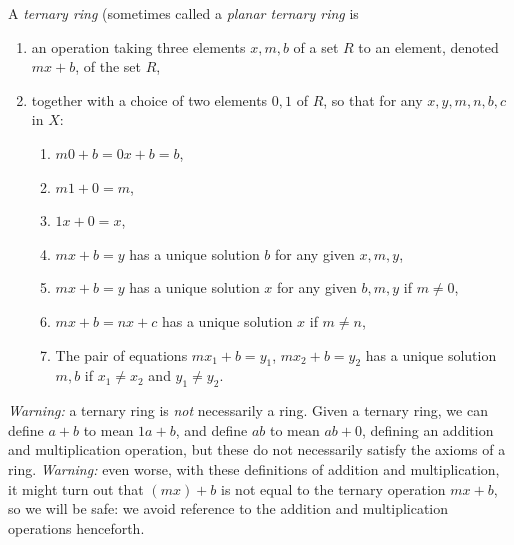 A \emph{ternary ring} (sometimes called a \emph{planar ternary ring} is 
\begin{enumerate}
\item
an operation taking three elements \(x,m,b\) of a set \(R\) to an element, denoted \(mx+b\), of the set \(R\), 
\item
together with a choice of two elements \(0,1\) of \(R\), so that for any \(x,y,m,n,b,c\) in \(X\):
\begin{enumerate}
\item\label{enum:A} \(m0+b=0x+b=b\),
\item \(m1+0=m\),
\item \(1x+0=x\),
\item \(mx+b=y\) has a unique solution \(b\) for any given \(x,m,y\),
\item \(mx+b=y\) has a unique solution \(x\) for any given \(b,m,y\) if \(m \ne 0\),
\item \(m x+b = n x + c\) has a unique solution \(x\) if \(m \ne n\),
\item The pair of equations \(m x_1 + b = y_1\), \(m x_2 + b = y_2\) has a unique solution \(m,b\) if \(x_1 \ne x_2\) and \(y_1 \ne y_2\).
\end{enumerate}
\end{enumerate}

\emph{Warning:} a ternary ring is \emph{not} necessarily a ring.
Given a ternary ring, we can define \(a+b\) to mean \(1a+b\), and define \(ab\) to mean \(ab+0\), defining an addition and multiplication operation, but these do not necessarily satisfy the axioms of a ring.
\emph{Warning:} even worse, with these definitions of addition and multiplication, it might turn out that \((mx)+b\) is not equal to the ternary operation \(mx+b\), so we will be safe: we avoid reference to the addition and multiplication operations henceforth.

